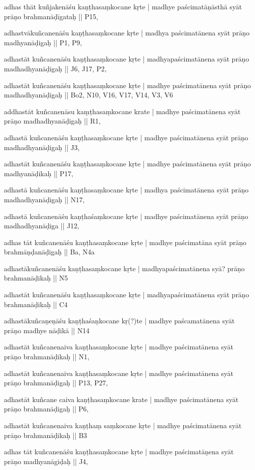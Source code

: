 \begin{ekdosis}
\begin{marma}[hp01_055]
\begin{marma}[hp02_009]
\begin{marma}[hp02_011]
\begin{marma}[hp02_46]
\item[adhas thāt kuñjakenāśu kaṇṭhasaṃkocane kṛte | madhye paścimatāṇāsthā syāt prāṇo brahmanāḍīgataḥ ||] P15, 
\item[adhastvākuñcanenāśu kaṇṭhasaṃkocane kṛte | madhya paścimatānena syāt prāṇo madhyanāḍigaḥ ||] P1, P9, 
\item[adhastāt kuñcanenāśu kaṇṭhasaṃkocane kṛte | madhyapaścimatānena syāt prāṇo madhadhyanāḍigaḥ ||] J6, J17, P2,
\item[adhastāt kuñcanenāśu kaṇṭhasaṃkocane kṛte | madhye paścimatānena syāt prāṇo madhadhyanāḍigaḥ ||] Bo2, N10, V16, V17, V14, V3, V6
\item[addhastāt kuñcanenāsu kaṃṭhasaṃkocane krate | madhye paścimatānena syāt prāṇo madhadhyanāḍigaḥ ||] R1, 
\item[adhastā kuñcanenāśu kaṇṭhasaṃkocane kṛte | madhye paścimatānena syāt prāṇo madhadhyanāḍigaḥ ||] J3,
\item[adhastāt kuñcanenāśu kaṇṭhasaṃkocane kṛte | madhye paścimatānena syāt prāṇo madhyanāḍikaḥ ||] P17, 
\item[adhastā kuñcanenāśu kaṇṭhasaṃkocane kṛte | madhya paścimatānena syāt prāṇo madhadhyanāḍigaḥ ||] N17,
\item[adhastā kuñcanenāśu kaṇṭhaśaṃkocane kṛte | madhye paścimatānena syāt prāṇo madhadhyanāḍiga ||] J12,
\item[adhas tāt kuñcanenāśu kaṇṭhasaṃkocane kṛte | madhye paścimatāna syāt prāṇo brahmāṇḍanāḍigaḥ ||]  Ba, N4a
\item[adhastākuñcanenāśu kaṇṭhasaṃkocane kṛte | madhyapaścimatānena syā? prāṇo brahmanāḍikaḥ ||]  N5
\item[adhastāt kuñcanenāśu kaṇṭhasaṃkocane kṛte | madhyapaścimatānena syāt prāṇo brahmanāḍikaḥ ||] C4
\item[adhastākuñcaṇeṇāśu kaṇṭhaśaṇkocane kṛ(?)te | madhye paścamatānena syāt prāṇo madhye nāḍikā ||] N14
\item[adhastāt kuñcanenaiva kaṇṭhasaṃkocane kṛte | madhye paścimatānena syāt prāṇo brahmanāḍikaḥ ||] N1,
\item[adhastāt kuñcanenaiva kaṇṭhasaṃkocane kṛte | madhye paścimatānena syāt prāṇo brahmanāḍigaḥ ||] P13, P27, 
\item[adhastāt kuñcane caiva kaṇṭhasaṃkocane krate | madhye paścimatānena syāt prāṇo brahmanāḍigaḥ ||] P6,
\item[adhastāt kuñcanenaiva kaṇṭhaṃ saṃkocane kṛte | madhye paścimatānena syāt prāṇo brahmanāḍikaḥ ||] B3
\item[adhas tāt kuñcanenāśu kaṇṭhasaṃkocane kṛte | madhye paścimatāṇena syāt prāṇo madhyanāgiḍaḥ ||] J4,

\end{marma}
\end{marma}
\end{marma}
\end{marma}
\end{ekdosis}
